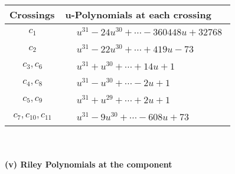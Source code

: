 \documentclass[1p]{elsarticle_modified}
\theoremstyle{definition}
\begin{document}
\begin{tabular}{m{50pt}|m{274pt}}
Crossings & \hspace{64pt}u-Polynomials at each crossing \\
\hline $$\begin{aligned}c_{1}\end{aligned}$$&$\begin{aligned}
&u^{31}-24 u^{30}+\cdots-360448 u+32768
\end{aligned}$\\
\hline $$\begin{aligned}c_{2}\end{aligned}$$&$\begin{aligned}
&u^{31}-22 u^{30}+\cdots+419 u-73
\end{aligned}$\\
\hline $$\begin{aligned}c_{3},c_{6}\end{aligned}$$&$\begin{aligned}
&u^{31}+u^{30}+\cdots+14 u+1
\end{aligned}$\\
\hline $$\begin{aligned}c_{4},c_{8}\end{aligned}$$&$\begin{aligned}
&u^{31}- u^{30}+\cdots-2 u+1
\end{aligned}$\\
\hline $$\begin{aligned}c_{5},c_{9}\end{aligned}$$&$\begin{aligned}
&u^{31}+u^{29}+\cdots+2 u+1
\end{aligned}$\\
\hline $$\begin{aligned}c_{7},c_{10},c_{11}\end{aligned}$$&$\begin{aligned}
&u^{31}-9 u^{30}+\cdots-608 u+73
\end{aligned}$\\
\hline
\end{tabular}\\~\\
\newpage\renewcommand{\arraystretch}{1}
\flushleft \textbf{(v) Riley Polynomials at the component}\newline \\
\end{document}
